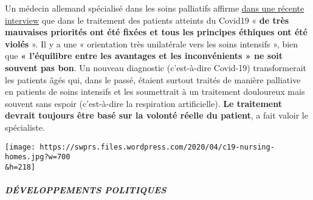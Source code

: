 Un médecin allemand spécialisé dans les soins palliatifs affirme
\href{https://www.deutschlandfunk.de/palliativmediziner-zu-covid-19-behandlungen-sehr-falsche.694.de.html?dram:article_id=474488}{dans
une récente interview} que dans le traitement des patients atteints du
Covid19 « \textbf{de très mauvaises priorités ont été fixées et tous les
principes éthiques ont été violés} ». Il y a une « orientation très
unilatérale vers les soins intensifs », bien que \textbf{« l'équilibre
entre les avantages et les inconvénients » ne soit souvent pas bon}. Un
nouveau diagnostic (c'est-à-dire Covid-19) transformerait les patients
âgés qui, dans le passé, étaient surtout traités de manière palliative
en patients de soins intensifs et les soumettrait à un traitement
douloureux mais souvent sans espoir (c'est-à-dire la respiration
artificielle). \textbf{Le traitement devrait toujours être basé sur la
volonté réelle du patient}, a fait valoir le spécialiste.

\texttt{[image: https://swprs.files.wordpress.com/2020/04/c19-nursing-homes.jpg?w=700\\\&h=218]}

\hypertarget{duxe9veloppements-politiques-1}{%
\subparagraph{\texorpdfstring{\textbf{DÉVELOPPEMENTS
POLITIQUES}}{DÉVELOPPEMENTS POLITIQUES}}\label{duxe9veloppements-politiques-1}}

